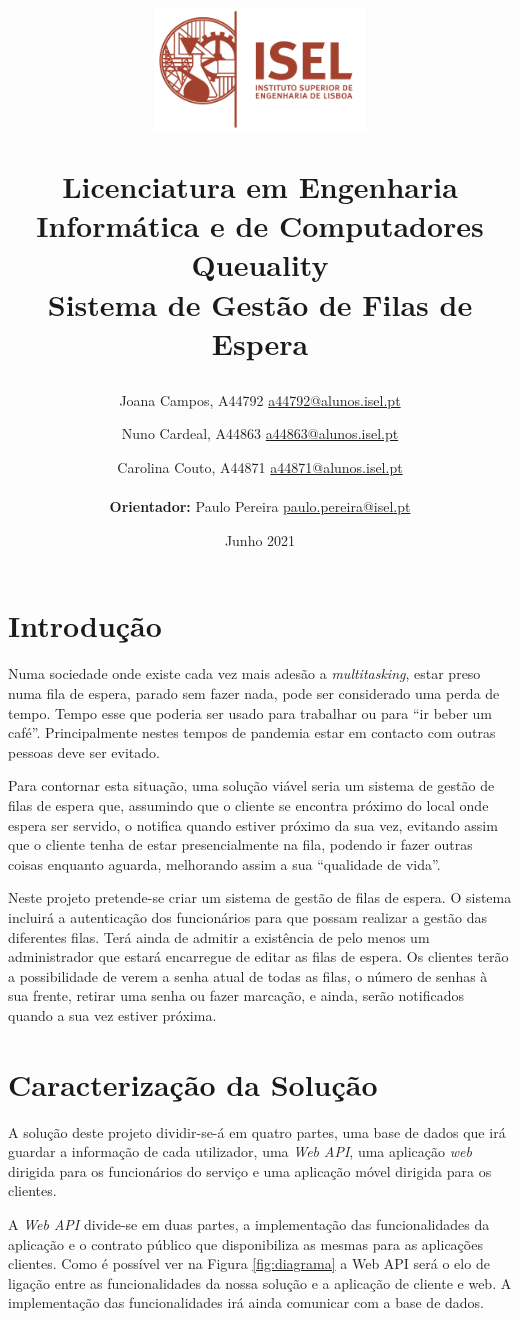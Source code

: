 \documentclass[12pt,a4paper]{article}
\title{

\begin{figure}[t!]
    \includegraphics[keepaspectratio, width=0.5\textwidth]{logoISEL}
\end{figure}

    \textbf{Licenciatura em Engenharia Informática e de Computadores} \vspace{5mm} \\
    \textbf{Queuality} \\ 
    \vspace{5mm}
    Sistema de Gestão de Filas de Espera
}
\author{
    Joana Campos, A44792 \href{mailto:a44792@alunos.isel.pt}{a44792@alunos.isel.pt} 
    \and Nuno Cardeal, A44863 \href{mailto:a44863@alunos.isel.pt}{a44863@alunos.isel.pt}
    \and Carolina Couto, A44871 \href{mailto:a44871@alunos.isel.pt}{a44871@alunos.isel.pt} \\
    \\
    \textbf{Orientador:} Paulo Pereira \href{mailto:paulo.pereira@isel.pt}{paulo.pereira@isel.pt}
}
\date{Junho 2021}
\begin{document}
\maketitle
\thispagestyle{empty}
\pagebreak
{}
\tableofcontents
\pagebreak
\listoffigures
\pagebreak
{}


\pagebreak
\section{Introdução}
Numa sociedade onde existe cada vez mais adesão a \textit{multitasking}, estar preso numa fila de espera,
parado sem fazer nada, pode ser considerado uma perda de tempo. Tempo esse que poderia ser usado
para trabalhar ou para “ir beber um café”. Principalmente nestes tempos de pandemia estar em contacto
com outras pessoas deve ser evitado.\par

Para contornar esta situação, uma solução viável seria um sistema de gestão de filas de espera que,
assumindo que o cliente se encontra próximo do local onde espera ser servido, o notifica quando estiver
próximo da sua vez, evitando assim que o cliente tenha de estar presencialmente na fila, podendo ir
fazer outras coisas enquanto aguarda, melhorando assim a sua “qualidade de vida”.\par

Neste projeto pretende-se criar um sistema de gestão de filas de espera. O sistema incluirá a
autenticação dos funcionários para que possam realizar a gestão das diferentes filas. Terá ainda de
admitir a existência de pelo menos um administrador que estará encarregue de editar as filas de espera.
Os clientes terão a possibilidade de verem a senha atual de todas as filas, o número de senhas à sua
frente, retirar uma senha ou fazer marcação, e ainda, serão notificados quando a sua vez estiver próxima.\par 

\pagebreak
\section{Caracterização da Solução}
A solução deste projeto dividir-se-á em quatro partes, uma base de dados que irá guardar a
informação de cada utilizador, uma \textit{Web API}, uma aplicação \textit{web} dirigida para os funcionários do
serviço e uma aplicação móvel dirigida para os clientes. 

A \textit{Web API} divide-se em duas partes, a implementação das funcionalidades da aplicação e o
contrato público que disponibiliza as mesmas para as aplicações clientes. Como é possível ver na Figura \ref{fig:diagrama} a Web API será o elo de ligação entre as funcionalidades da nossa solução e a aplicação de cliente e
web. A implementação das funcionalidades irá ainda comunicar com a base de dados.
\end{document}
